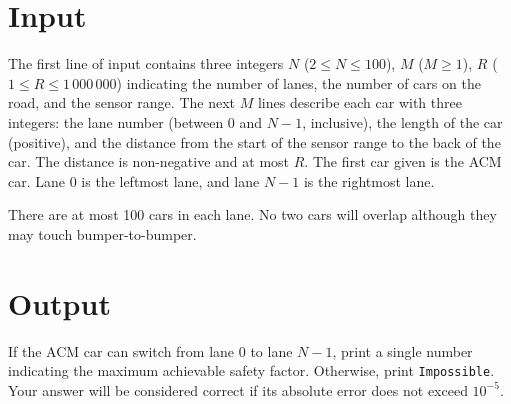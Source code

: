 \section*{Input}

The first line of input contains three integers $N$
($2 \leq N \leq 100$), $M$ ($M \geq 1$), $R$
($1 \leq R \leq 1\,000\,000$) indicating the number of lanes, the
number of cars on the road, and the sensor range.  The next $M$ lines
describe each car with three integers: the lane number (between 0 and
$N-1$, inclusive), the length of the car (positive), and the
distance from the start of the sensor range to the back of the car.
The distance is non-negative and at most $R$.  The first car given is
the ACM car.  Lane 0 is the leftmost lane, and lane $N-1$ is the
rightmost lane.

There are at most 100 cars in each lane.  No two cars will overlap
although they may touch bumper-to-bumper.


\section*{Output}

If the ACM car can switch from lane 0 to lane $N-1$, print a single
number indicating the maximum achievable safety factor.  Otherwise,
print \texttt{Impossible}.  Your answer will be considered correct if
its absolute error does not exceed $10^{-5}$.
